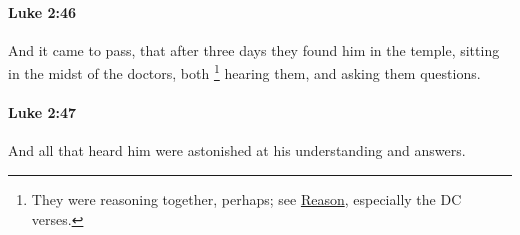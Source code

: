 		\paragraph{Luke 2:46} %
			\label{LUKE-2-46}

			And it came to pass, that after three days they found him in the temple, sitting in the midst of the doctors, both%
				\footnote{%
					They were reasoning together, perhaps; see \hyperref[REASON]{Reason}, especially the DC verses.
					}
			hearing them, and asking them questions.

			\begin{framed}
			\scriptsize
				\begin{compactdesc}
					\item[SBLG] 
				\end{compactdesc}
			\end{framed}

		\paragraph{Luke 2:47} %
			\label{LUKE-2-47}

			And all that heard him were astonished at his understanding and answers.

